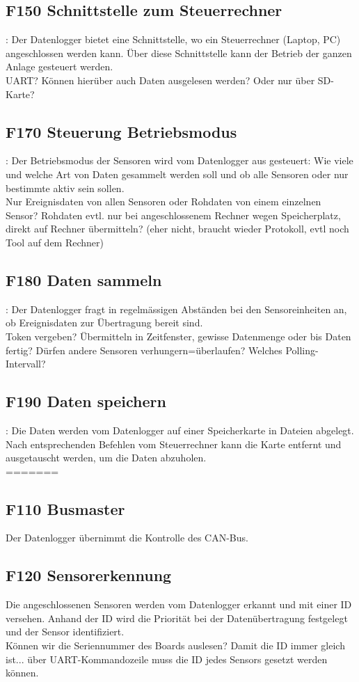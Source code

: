 \subsection{F150 Schnittstelle zum Steuerrechner}: Der Datenlogger bietet eine Schnittstelle, wo ein Steuerrechner (Laptop, PC) angeschlossen werden kann. Über diese Schnittstelle kann der Betrieb der ganzen Anlage gesteuert werden.\\
UART? Können hierüber auch Daten ausgelesen werden? Oder nur über SD-Karte?
 
\subsection{F170 Steuerung Betriebsmodus}: Der Betriebsmodus der Sensoren wird vom Datenlogger aus gesteuert: Wie viele und welche Art von Daten gesammelt werden soll und ob alle Sensoren oder nur bestimmte aktiv sein sollen. \\
Nur Ereignisdaten von allen Sensoren oder Rohdaten von einem einzelnen Sensor? Rohdaten evtl. nur bei angeschlossenem Rechner wegen Speicherplatz, direkt auf Rechner übermitteln? (eher nicht, braucht wieder Protokoll, evtl noch Tool auf dem Rechner)

\subsection{F180 Daten sammeln}: Der Datenlogger fragt in regelmässigen Abständen bei den Sensoreinheiten an, ob Ereignisdaten zur Übertragung bereit sind.\\
Token vergeben? Übermitteln in Zeitfenster, gewisse Datenmenge oder bis Daten fertig? Dürfen andere Sensoren verhungern=überlaufen? Welches Polling-Intervall?

\subsection{F190 Daten speichern}: Die Daten werden vom Datenlogger auf einer Speicherkarte in Dateien abgelegt. Nach entsprechenden Befehlen vom Steuerrechner kann die Karte entfernt und ausgetauscht werden, um die Daten abzuholen.\\
=======
\subsection{F110 Busmaster}
Der Datenlogger übernimmt die Kontrolle des CAN-Bus. 

\subsection{F120 Sensorerkennung}
Die angeschlossenen Sensoren werden vom Datenlogger erkannt und mit einer ID versehen. Anhand der ID wird die Priorität bei der Datenübertragung festgelegt und der Sensor identifiziert.\\
Können wir die Seriennummer des Boards auslesen? Damit die ID immer gleich ist... über UART-Kommandozeile muss die ID jedes Sensors gesetzt werden können.

